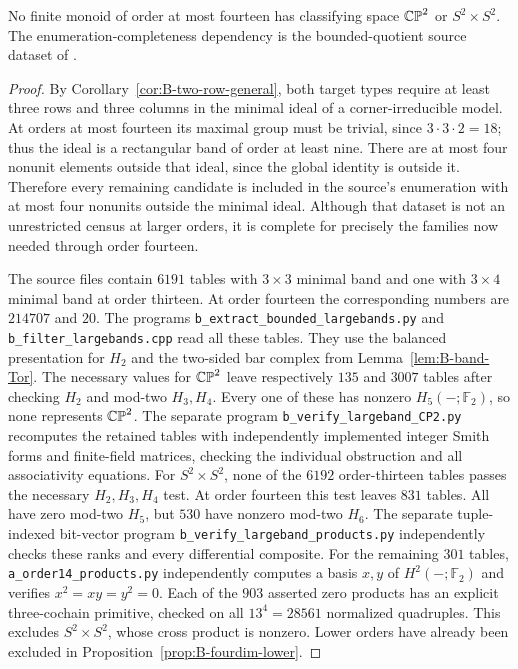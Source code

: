\begin{proposition}
\label{prop:B-fourdim-lower14}
No finite monoid of order at most fourteen has classifying space
$\mathbb {CP}^2$ or $S^2\times S^2$.
The enumeration-completeness dependency is the bounded-quotient
source dataset of \cite{SweeneyEnumeration2026B}.
\end{proposition}
\begin{proof}
By Corollary~\ref{cor:B-two-row-general}, both target types require
at least three rows and three columns in the minimal ideal of a
corner-irreducible model.  At orders at most fourteen its maximal
group must be trivial, since $3\cdot3\cdot2=18$; thus the ideal
is a rectangular band of order at least nine.  There are at most
four nonunit elements outside that ideal, since the global identity
is outside it.  Therefore every remaining candidate is included in
the source's enumeration with at most four nonunits outside the
minimal ideal.  Although that dataset is not an unrestricted census
at larger orders, it is complete for precisely the families now needed
through order fourteen.

The source files contain $6191$ tables with $3\times3$ minimal band
and one with $3\times4$ minimal band at order thirteen.  At order
fourteen the corresponding numbers are $214707$ and $20$.
The programs \texttt{b\_extract\_bounded\_largebands.py} and
\texttt{b\_filter\_largebands.cpp} read all these tables.
They use the balanced presentation for $H_2$ and the two-sided bar
complex from Lemma~\ref{lem:B-band-Tor}.  The necessary values for
$\mathbb {CP}^2$ leave respectively $135$ and $3007$ tables after checking
$H_2$ and mod-two $H_3,H_4$.  Every one of these has nonzero
$H_5(-;\mathbb F_2)$, so none represents $\mathbb {CP}^2$.
The separate program \texttt{b\_verify\_largeband\_CP2.py}
recomputes the retained tables with independently implemented
integer Smith forms and finite-field matrices, checking the
individual obstruction and all associativity equations.
For $S^2\times S^2$, none of the $6192$ order-thirteen tables
passes the necessary $H_2,H_3,H_4$ test.  At order fourteen this test
leaves $831$ tables.  All have zero mod-two $H_5$, but $530$ have
nonzero mod-two $H_6$.  The separate tuple-indexed bit-vector program
\texttt{b\_verify\_largeband\_products.py} independently checks
these ranks and every differential composite.  For the remaining
$301$ tables, \texttt{a\_order14\_products.py} independently
computes a basis $x,y$ of $H^2(-;\mathbb F_2)$ and verifies
$x^2=xy=y^2=0$.  Each of the $903$ asserted zero products has an
explicit three-cochain primitive, checked on all $13^4=28561$
normalized quadruples.  This excludes $S^2\times S^2$, whose
cross product is nonzero.
Lower orders have already been excluded in
Proposition~\ref{prop:B-fourdim-lower}.


\end{proof}

